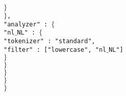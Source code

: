 \indent \indent \indent \indent                \texttt{$\}$}\\
\indent \indent \indent            \texttt{$\}$,}\\
\indent \indent \indent           \texttt{"analyzer" : $\{$}\\
\indent \indent \indent \indent                 \texttt{"nl$\_$NL" : $\{$}\\
\indent \indent \indent \indent \indent                    \texttt{"tokenizer" : "standard",}\\
\indent \indent \indent \indent \indent                     \texttt{"filter" : ["lowercase",     "nl$\_$NL"]}\\
\indent \indent \indent \indent             \texttt{$\}$}\\
\indent \indent \indent           \texttt{$\}$}\\
\indent \indent       \texttt{$\}$}\\
\indent   \texttt{$\}$}\\
\texttt{$\}$}\\
\clearpage